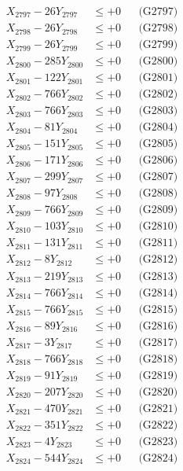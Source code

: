 \documentclass[a4paper,10pt]{article}
\begin{document}
{\begin{align}
X_{2797} - 26Y_{2797} &\leq +0 && \text{(G2797)} \\
X_{2798} - 26Y_{2798} &\leq +0 && \text{(G2798)} \\
X_{2799} - 26Y_{2799} &\leq +0 && \text{(G2799)} \\
X_{2800} - 285Y_{2800} &\leq +0 && \text{(G2800)} \\
\allowbreak
X_{2801} - 122Y_{2801} &\leq +0 && \text{(G2801)} \\
X_{2802} - 766Y_{2802} &\leq +0 && \text{(G2802)} \\
X_{2803} - 766Y_{2803} &\leq +0 && \text{(G2803)} \\
X_{2804} - 81Y_{2804} &\leq +0 && \text{(G2804)} \\
X_{2805} - 151Y_{2805} &\leq +0 && \text{(G2805)} \\
X_{2806} - 171Y_{2806} &\leq +0 && \text{(G2806)} \\
X_{2807} - 299Y_{2807} &\leq +0 && \text{(G2807)} \\
X_{2808} - 97Y_{2808} &\leq +0 && \text{(G2808)} \\
X_{2809} - 766Y_{2809} &\leq +0 && \text{(G2809)} \\
X_{2810} - 103Y_{2810} &\leq +0 && \text{(G2810)} \\
\allowbreak
X_{2811} - 131Y_{2811} &\leq +0 && \text{(G2811)} \\
X_{2812} - 8Y_{2812} &\leq +0 && \text{(G2812)} \\
X_{2813} - 219Y_{2813} &\leq +0 && \text{(G2813)} \\
X_{2814} - 766Y_{2814} &\leq +0 && \text{(G2814)} \\
X_{2815} - 766Y_{2815} &\leq +0 && \text{(G2815)} \\
X_{2816} - 89Y_{2816} &\leq +0 && \text{(G2816)} \\
X_{2817} - 3Y_{2817} &\leq +0 && \text{(G2817)} \\
X_{2818} - 766Y_{2818} &\leq +0 && \text{(G2818)} \\
X_{2819} - 91Y_{2819} &\leq +0 && \text{(G2819)} \\
X_{2820} - 207Y_{2820} &\leq +0 && \text{(G2820)} \\
\allowbreak
X_{2821} - 470Y_{2821} &\leq +0 && \text{(G2821)} \\
X_{2822} - 351Y_{2822} &\leq +0 && \text{(G2822)} \\
X_{2823} - 4Y_{2823} &\leq +0 && \text{(G2823)} \\
X_{2824} - 544Y_{2824} &\leq +0 && \text{(G2824)} \\

\end{align}}
\end{document}

